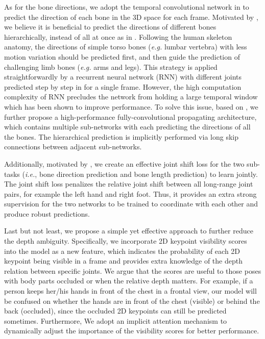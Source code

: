 \documentclass[journal]{IEEEtran}
\begin{document}
As for the bone directions, we adopt the temporal convolutional network in \cite{pavllo20193d} to predict the direction of each bone in the 3D space for each frame. Motivated by \cite{lee2018propagating}, we believe it is beneficial to predict the directions of different bones hierarchically, instead of all at once as in \cite{pavllo20193d}. Following the human skeleton anatomy, the directions of simple torso bones (\emph{e.g.} lumbar vertebra) with less motion variation should be predicted first, and then guide the prediction of challenging limb bones (\emph{e.g.} arms and legs). This strategy is applied straightforwardly by a recurrent neural network (RNN) with different joints predicted step by step in \cite{lee2018propagating} for a single frame. However, the high computation complexity of RNN precludes the network from holding a large temporal window which has been shown to improve performance. To solve this issue, based on \cite{pavllo20193d}, we further propose a high-performance fully-convolutional propagating architecture, which contains multiple sub-networks with each predicting the directions of all the bones. The hierarchical prediction is implicitly performed via long skip connections between adjacent sub-networks. 


Additionally, motivated by \cite{sun2017compositional}, we create an effective joint shift loss for the two sub-tasks (\emph{i.e.}, bone direction prediction and bone length prediction) to learn jointly. The joint shift loss penalizes the relative joint shift between all long-range joint pairs, for example the left hand and right foot. Thus, it provides an extra strong supervision for the two networks to be trained to coordinate with each other and produce robust predictions. 



Last but not least, we propose a simple yet effective approach to further reduce the depth ambiguity. Specifically, we incorporate 2D keypoint visibility scores into the model as a new feature, which indicates the probability of each 2D keypoint being visible in a frame and provides extra knowledge of the depth relation between specific joints. We argue that the scores are useful to those poses with body parts occluded or when the relative depth matters. For example, if a person keeps her/his hands in front of the chest in a frontal view, our model will be confused on whether the hands are in front of the chest (visible) or behind the back (occluded), since  the occluded 2D keypoints can still be predicted sometimes. Furthermore, We adopt an implicit attention mechanism to dynamically adjust the importance of the visibility scores for better performance.
\end{document}
